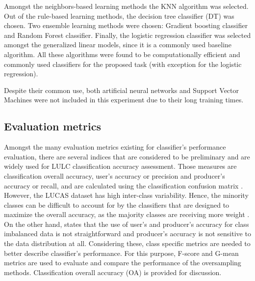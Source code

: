 \documentclass[remotesensing,article,submit,moreauthors,pdftex]{Definitions/mdpi}
\begin{document}
Amongst the neighbors-based learning methods the KNN algorithm was selected. Out
of the rule-based learning methods, the decision tree classifier (DT) was
chosen. Two ensemble learning methods were chosen: Gradient boosting classifier
and Random Forest classifier. Finally, the logistic regression classifier was
selected amongst the generalized linear models, since it is a commonly used
baseline algorithm. All these algorithms were found to be computationally
efficient and commonly used classifiers for the proposed task (with exception
for the logistic regression).

Despite their common use, both artificial neural networks and Support Vector
Machines were not included in this experiment due to their long training times.

\subsection{Evaluation metrics} \label{evaluation methods}

Amongst the many evaluation metrics existing for classifier's performance
evaluation, there are several indices that are considered to be preliminary and
are widely used for LULC classification accuracy assessment. Those measures are
classification overall accuracy, user's accuracy or precision and producer's
accuracy or recall,  and are calculated using the classification confusion
matrix \cite{Liu2007}. However, the LUCAS dataset has high inter-class
variability. Hence, the minority classes can be difficult to account for by the
classifiers that are designed to maximize the overall accuracy, as the majority
classes are receiving more weight \cite{Inglada2017}. On the other hand,
\cite{He2008} states that the use of user's and producer's accuracy for class
imbalanced data is not straightforward and producer's accuracy is not sensitive
to the data distribution at all. Considering these, class specific metrics are
needed to better describe classifier's performance. For this purpose, F-score
and G-mean metrics are used to evaluate and compare the performance of the
oversampling methods. Classification overall accuracy (OA) is provided for
discussion.
\end{document}
